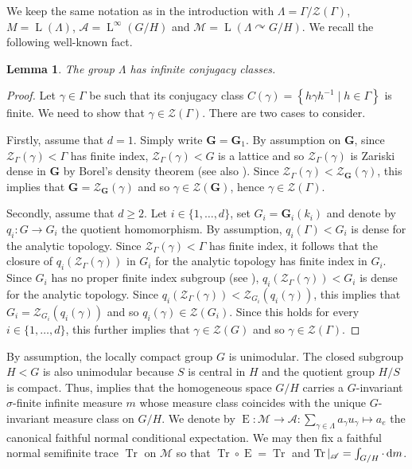 \documentclass[11pt]{amsart}
\numberwithin{equation}{section}
\theoremstyle{plain}
\newtheorem{lem}[thm]{Lemma}
\theoremstyle{definition}
\newcommand{\Tr}{\operatorname{Tr}}
\newcommand{\rE}{\operatorname{ E}}
\newcommand{\rL}{\operatorname{ L}}
\begin{document}
We keep the same notation as in the introduction with $\Lambda = \Gamma/\mathscr Z(\Gamma)$, $M = \rL(\Lambda)$, $\mathscr A = \rL^\infty(G/H)$ and $\mathscr M = \rL(\Lambda \curvearrowright G/H)$. We recall the following well-known fact.

\begin{lem}\label{lem-icc}
The group $\Lambda$ has infinite conjugacy classes.
\end{lem}

\begin{proof}
Let $\gamma \in \Gamma$ be such that its conjugacy class $C(\gamma) = \left \{ h \gamma h^{-1} \mid h \in \Gamma\right \}$ is finite. We need to show that $\gamma \in \mathscr Z(\Gamma)$. There are two cases to consider.

Firstly, assume that $d = 1$. Simply write $\mathbf G = \mathbf G_1$. By assumption on $\mathbf G$, since $\mathscr Z_\Gamma(\gamma) < \Gamma$ has finite index, $\mathscr Z_\Gamma(\gamma) < G$ is a lattice and so $\mathscr Z_\Gamma(\gamma)$ is Zariski dense in $\mathbf G$ by Borel's density theorem \cite{Bo60} (see also \cite{Sh97, BDL14}). Since $\mathscr Z_\Gamma(\gamma) < \mathscr Z_{\mathbf G}(\gamma)$, this implies that $\mathbf G = \mathscr Z_{\mathbf G}(\gamma)$ and so $\gamma \in \mathscr Z(\mathbf G)$, hence $\gamma \in \mathscr Z(\Gamma)$.

Secondly, assume that $d \geq 2$. Let $i \in \{1, \dots, d\}$, set $G_i = \mathbf G_i(k_i)$ and denote by $q_i : G \to G_i$ the quotient homomorphism. By assumption, $q_i(\Gamma) < G_i$ is dense for the analytic topology. Since $\mathscr Z_\Gamma(\gamma) < \Gamma$ has finite index, it follows that the closure of $q_i(\mathscr Z_\Gamma(\gamma))$ in $G_i$ for the analytic topology has finite index in $G_i$. Since $G_i$ has no proper finite index subgroup (see \cite[Corollary I.1.5.7]{Ma91}), $q_i(\mathscr Z_\Gamma(\gamma)) < G_i$ is dense for the analytic topology. Since $q_i(\mathscr Z_\Gamma(\gamma)) < \mathscr Z_{G_i}(q_i(\gamma))$, this implies that $G_i =  \mathscr Z_{G_i}(q_i(\gamma))$ and so $q_i(\gamma) \in \mathscr Z(G_i)$. Since this holds for every $i \in \{1, \dots, d\}$, this further implies that $\gamma \in \mathscr Z(G)$ and so $\gamma \in \mathscr Z(\Gamma)$.
\end{proof}


By assumption, the locally compact group $G$ is unimodular. The closed subgroup $H < G$ is also unimodular because $S$ is central in $H$ and the quotient group $H/S$ is compact. Thus, \cite[Corollary B.1.7]{BHV08} implies that the homogeneous space $G/H$ carries a $G$-invariant $\sigma$-finite infinite measure $m$ whose measure class coincides with the unique $G$-invariant measure class on $G/H$. We denote by $\rE : \mathscr M \to \mathscr A : \sum_{\gamma \in \Lambda} a_\gamma u_\gamma \mapsto a_e$ the canonical faithful normal conditional expectation. We may then fix a faithful normal semifinite trace $\Tr$ on $\mathscr M$ so that $\Tr \circ \rE = \Tr$ and $\Tr|_{\mathscr A} = \int_{G/H} \cdot \, {\rm d}m$.
\end{document}
